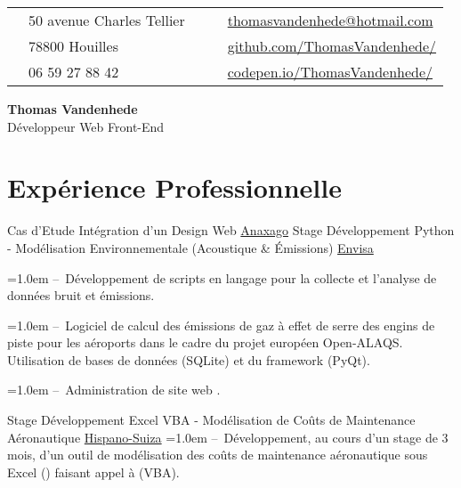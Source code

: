 \documentclass[10pt, a4paper]{article}
\def\GithubIcon{{\FA \faGithub}}
\def\CodepenIcon{{\FA \faCodepen}}
\def\EnvelopeIcon{{\FA \faEnvelopeO}}
\def\MapMarkerIcon{{\FA \faMapMarker}}
\def\PhoneIcon{{\FA \faPhone}}
\begin{document}
\begin{minipage}[t]{\textwidth}
	\begin{tabularx}{\linewidth}{@{}l l X c l@{}}
		\MapMarkerIcon	& 50 avenue Charles Tellier		& & \EnvelopeIcon	& \href{mailto:thomasvandenhede@hotmail.com}{thomasvandenhede@hotmail.com}\\
						& 78800 Houilles				& & \GithubIcon		& \href{https://github.com/ThomasVandenhede/}{github.com/ThomasVandenhede/}\\
		\PhoneIcon		& 06 59 27 88 42				& & \CodepenIcon	& \href{https://codepen.io/ThomasVandenhede/}{codepen.io/ThomasVandenhede/}\\
	\end{tabularx}
\end{minipage}
\bigskip


\begin{center}
	\Huge \textbf{Thomas Vandenhede}\smallskip\\
	\LARGE Développeur Web Front-End\bigskip
\end{center}

\section{Expérience Professionnelle}
\begin{experiences}
	{Cas d'Etude Intégration d'un Design Web}
	{\hfill}
	{\href{http://anaxago.com/}{Anaxago}}
	{}
	{Stage Développement Python - Modélisation Environnementale (Acoustique \& \'Emissions)}
	{\hfill}
	{\href{http://www.env-isa.com}{Envisa}}
	{\hangindent=1.0em --~Développement de scripts en langage \python pour la collecte et l'analyse de données bruit et émissions.

	\hangindent=1.0em --~Logiciel \python de calcul des émissions de gaz à effet de serre des engins de piste pour les aéroports dans le cadre du projet européen Open-ALAQS. Utilisation de bases de données \sql (SQLite) et du framework \qt (PyQt).
	
	\hangindent=1.0em --~Administration de site web \wordpress.}
	{Stage Développement Excel VBA - Modélisation de Coûts de Maintenance Aéronautique}
	{\hfill}
	{\href{http://www.safran-transmission-systems.com}{Hispano-Suiza}}
	{\hangindent=1.0em --~Développement, au cours d'un stage de 3 mois, d'un outil de modélisation des coûts de maintenance aéronautique sous Excel (\office) faisant appel à \visb (VBA).}
\end{experiences}
\end{document}

